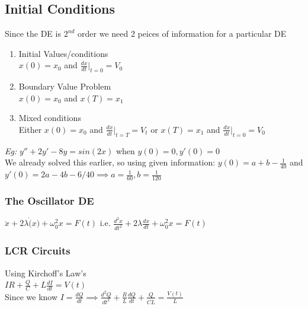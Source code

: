 \documentclass[11pt]{article}
\theoremstyle{definition}
\begin{document}
\subsection{Initial Conditions}
Since the DE is $2^{nd}$ order we need 2 peices of information for a particular DE
\begin{enumerate}
    \item Initial Values/conditions\\
    $x(0) = x_0$ and $\frac{dx}{dt}|_{t = 0} = V_0$
    \item Boundary Value Problem\\
    $x(0) = x_0$ and $x(T) = x_1$
    \item Mixed conditions\\
    Either $x(0) = x_0$ and $\frac{dx}{dt}|_{t = T} = V_t$ or $x(T) = x_1$ and $\frac{dx}{dt}|_{t = 0} = V_0$
\end{enumerate}
\textit{Eg:} $y'' +2y' -8y = sin(2x)$ when $y(0) = 0 , y'(0) = 0$\\
We already solved this earlier, so using given information:
$y(0) = a + b - \frac{1}{40}$ and $y'(0) = 2a - 4b -6/40 \implies a = \frac{1}{60}, b = \frac{1}{120}$
\subsubsection{The Oscillator DE}
$\ddot{x} + 2\lambda\dot(x) + \omega_0^2x = F(t)$ i.e. $\frac{d^2x}{dt^2} + 2\lambda \frac{dx}{dt} + \omega_0^2x = F(t)$
\subsubsection{LCR Circuits}
Using Kirchoff's Law's\\
$IR + \frac{Q}{C} + L\frac{dI}{dt} = V(t)$\\
Since we know $I = \frac{dQ}{dt} \implies \frac{d^2Q}{dt^2} + \frac{R}{L}\frac{dQ}{dt} + \frac{Q}{C\dot L} = \frac{V(t)}{L}$
\end{document}
